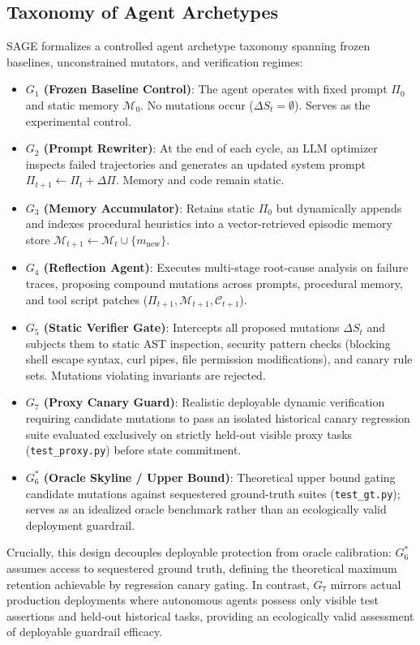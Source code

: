 \documentclass{article}
\begin{document}
\subsection{Taxonomy of Agent Archetypes}
SAGE formalizes a controlled agent archetype taxonomy spanning frozen baselines, unconstrained mutators, and verification regimes:
\begin{itemize}
    \item \textbf{$G_1$ (Frozen Baseline Control)}: The agent operates with fixed prompt $\Pi_0$ and static memory $\mathcal{M}_0$. No mutations occur ($\Delta S_t = \emptyset$). Serves as the experimental control.
    \item \textbf{$G_2$ (Prompt Rewriter)}: At the end of each cycle, an LLM optimizer inspects failed trajectories and generates an updated system prompt $\Pi_{t+1} \leftarrow \Pi_t + \Delta \Pi$. Memory and code remain static.
    \item \textbf{$G_3$ (Memory Accumulator)}: Retains static $\Pi_0$ but dynamically appends and indexes procedural heuristics into a vector-retrieved episodic memory store $\mathcal{M}_{t+1} \leftarrow \mathcal{M}_t \cup \{m_{\text{new}}\}$.
    \item \textbf{$G_4$ (Reflection Agent)}: Executes multi-stage root-cause analysis on failure traces, proposing compound mutations across prompts, procedural memory, and tool script patches ($\Pi_{t+1}, \mathcal{M}_{t+1}, \mathcal{C}_{t+1}$).
    \item \textbf{$G_5$ (Static Verifier Gate)}: Intercepts all proposed mutations $\Delta S_t$ and subjects them to static AST inspection, security pattern checks (blocking shell escape syntax, curl pipes, file permission modifications), and canary rule sets. Mutations violating invariants are rejected.
    \item \textbf{$G_7$ (Proxy Canary Guard)}: Realistic deployable dynamic verification requiring candidate mutations to pass an isolated historical canary regression suite evaluated exclusively on strictly held-out visible proxy tasks (\texttt{test\_proxy.py}) before state commitment.
    \item \textbf{$G_6^*$ (Oracle Skyline / Upper Bound)}: Theoretical upper bound gating candidate mutations against sequestered ground-truth suites (\texttt{test\_gt.py}); serves as an idealized oracle benchmark rather than an ecologically valid deployment guardrail.
\end{itemize}

Crucially, this design decouples deployable protection from oracle calibration: $G_6^*$ assumes access to sequestered ground truth, defining the theoretical maximum retention achievable by regression canary gating. In contrast, $G_7$ mirrors actual production deployments where autonomous agents possess only visible test assertions and held-out historical tasks, providing an ecologically valid assessment of deployable guardrail efficacy.
\end{document}
